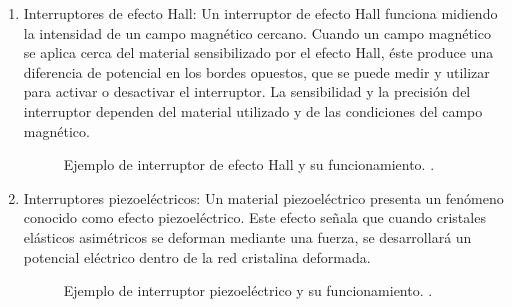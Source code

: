 \begin{enumerate}
\begin{enumerate}
				\item Interruptores de efecto Hall: Un interruptor de efecto Hall funciona midiendo la intensidad de un campo magnético cercano. Cuando un campo magnético se aplica cerca del material sensibilizado por el efecto Hall, éste produce una diferencia de potencial en los bordes opuestos, que se puede medir y utilizar para activar o desactivar el interruptor. La sensibilidad y la precisión del interruptor dependen del material utilizado y de las condiciones del campo magnético.\cite{Efecto_Hall}\\
				
				\begin{figure}[h]
					\centering
					\hspace{0.5cm} %
					\caption{Ejemplo de interruptor de efecto Hall y su funcionamiento. \cite{EfectoHall}.}
					\label{fig:HallGeneral}
					
				\end{figure}
				
				\item Interruptores piezoeléctricos: Un material piezoeléctrico presenta un fenómeno conocido como efecto piezoeléctrico. Este efecto señala que cuando cristales elásticos asimétricos se deforman mediante una fuerza, se desarrollará un potencial eléctrico dentro de la red cristalina deformada. \cite{saha2010robotics}
				
					\begin{figure}[h]
					\centering
					\hspace{0.5cm} %
					\caption{Ejemplo de interruptor piezoeléctrico y su funcionamiento. \cite{Piezoelectrico}.}
					\label{fig:PiezoeléctricoGeneral}
					
					
				\end{figure}
				
			\end{enumerate}
		\end{enumerate}
		
